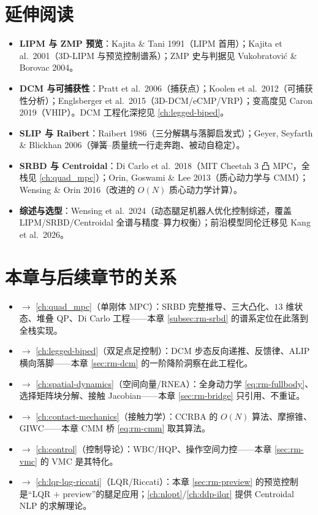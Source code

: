 \section*{延伸阅读}
\begin{itemize}
  \item \textbf{LIPM 与 ZMP 预览}：Kajita \& Tani 1991\cite{kajita1991study}（LIPM 首用）；Kajita et al.\ 2001\cite{kajita2001lipm}（3D-LIPM 与预览控制谱系）；ZMP 史与判据见 Vukobratović \& Borovac 2004\cite{vukobratovic2004zero}。
  \item \textbf{DCM 与可捕获性}：Pratt et al.\ 2006\cite{pratt2006capture}（捕获点）；Koolen et al.\ 2012\cite{koolen2012capturability}（可捕获性分析）；Englsberger et al.\ 2015\cite{englsberger2015dcm}（3D-DCM/eCMP/VRP）；变高度见 Caron 2019\cite{caron2019capturability}（VHIP）。DCM 工程化深挖见 \cref{ch:legged-biped}。
  \item \textbf{SLIP 与 Raibert}：Raibert 1986\cite{raibert1986legged}（三分解耦与落脚启发式）；Geyer, Seyfarth \& Blickhan 2006\cite{geyer2006compliant}（弹簧–质量统一行走奔跑、被动自稳定）。
  \item \textbf{SRBD 与 Centroidal}：Di Carlo et al.\ 2018\cite{dicarlo2018cheetah}（MIT Cheetah 3 凸 MPC，全栈见 \cref{ch:quad_mpc}）；Orin, Goswami \& Lee 2013\cite{orin2013centroidal}（质心动力学与 CMM）；Wensing \& Orin 2016\cite{wensing2016improved}（改进的 $O(N)$ 质心动力学计算）。
  \item \textbf{综述与选型}：Wensing et al.\ 2024\cite{wensing2024legged}（动态腿足机器人优化控制综述，覆盖 LIPM/SRBD/Centroidal 全谱与精度–算力权衡）；前沿模型同伦迁移见 Kang et al.\ 2026\cite{kang2026dynamic}。
\end{itemize}

\section*{本章与后续章节的关系}
\begin{itemize}
  \item $\to$ \cref{ch:quad_mpc}（单刚体 MPC）：SRBD 完整推导、三大凸化、$13$ 维状态、堆叠 QP、Di Carlo 工程——本章 \cref{subsec:rm-srbd} 的谱系定位在此落到全栈实现。
  \item $\to$ \cref{ch:legged-biped}（双足点足控制）：DCM 步态反向递推、反馈律、ALIP 横向落脚——本章 \cref{sec:rm-dcm} 的一阶降阶洞察在此工程化。
  \item $\to$ \cref{ch:spatial-dynamics}（空间向量/RNEA）：全身动力学 \cref{eq:rm-fullbody}、选择矩阵块分解、接触 Jacobian——本章 \cref{sec:rm-bridge} 只引用、不重证。
  \item $\to$ \cref{ch:contact-mechanics}（接触力学）：CCRBA 的 $O(N)$ 算法、摩擦锥、GIWC——本章 CMM 桥 \cref{eq:rm-cmm} 取其算法。
  \item $\to$ \cref{ch:control}（控制导论）：WBC/HQP、操作空间力控——本章 \cref{sec:rm-vmc} 的 VMC 是其特化。
  \item $\to$ \cref{ch:lqr-lqg-riccati}（LQR/Riccati）：本章 \cref{sec:rm-preview} 的预览控制是“LQR $+$ preview”的腿足应用；\cref{ch:nlopt}/\cref{ch:ddp-ilqr} 提供 Centroidal NLP 的求解理论。
\end{itemize}
